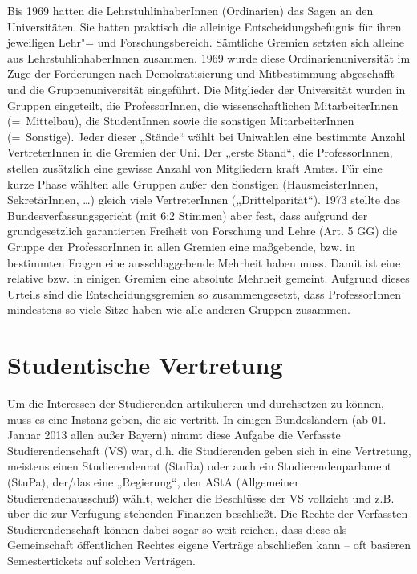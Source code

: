 Bis 1969 hatten die LehrstuhlinhaberInnen (Ordinarien) das Sagen an den
Universitäten. Sie hatten praktisch die alleinige Entscheidungsbefugnis
für ihren jeweiligen Lehr"= und Forschungsbereich. Sämtliche Gremien setzten
sich alleine aus LehrstuhlinhaberInnen zusammen. 1969 wurde diese
Ordinarienuniversität im Zuge der Forderungen nach Demokratisierung und
Mitbestimmung abgeschafft und die Gruppenuniversität eingeführt. Die
Mitglieder der Universität wurden in Gruppen eingeteilt, die
ProfessorInnen, die wissenschaftlichen MitarbeiterInnen (=\ Mittelbau), die
StudentInnen sowie die sonstigen MitarbeiterInnen (=\ Sonstige). Jeder
dieser „Stände“ wählt bei Uniwahlen eine bestimmte Anzahl VertreterInnen
in die Gremien der Uni. Der „erste Stand“, die ProfessorInnen, stellen
zusätzlich eine gewisse Anzahl von Mitgliedern kraft Amtes. Für eine kurze
Phase wählten alle Gruppen außer den Sonstigen (HausmeisterInnen,
SekretärInnen, \dots) gleich viele VertreterInnen („Drittelparität“).
1973 stellte das Bundesverfassungsgericht (mit 6:2 Stimmen) aber fest, dass
aufgrund der grundgesetzlich garantierten Freiheit von Forschung und Lehre
(Art. 5 GG) die Gruppe der ProfessorInnen in allen Gremien eine
maßgebende, bzw. in bestimmten Fragen eine ausschlaggebende Mehrheit haben
muss. Damit ist eine relative bzw. in einigen Gremien eine absolute
Mehrheit gemeint. Aufgrund dieses Urteils sind die Entscheidungsgremien so
zusammengesetzt, dass ProfessorInnen mindestens so viele Sitze haben wie
alle anderen Gruppen zusammen.

\section{Studentische Vertretung}
Um die Interessen der Studierenden artikulieren und durchsetzen zu können, muss
es eine Instanz geben, die sie vertritt. In einigen Bundesländern (ab 01.
Januar 2013 allen außer Bayern) nimmt diese Aufgabe die Verfasste
Studierendenschaft (VS) war, d.h. die Studierenden geben sich in eine
Vertretung, meistens einen Studierendenrat (StuRa) oder auch ein
Studierendenparlament (StuPa), der/das eine „Regierung“, den AStA (Allgemeiner
Studierendenausschuß) wählt, welcher die Beschlüsse der VS vollzieht und z.B.
über die zur Verfügung stehenden Finanzen beschließt.  Die Rechte der
Verfassten Studierendenschaft können dabei sogar so weit reichen, dass diese
als Gemeinschaft öffentlichen Rechtes eigene Verträge abschließen kann -- oft
basieren Semestertickets auf solchen Verträgen.

